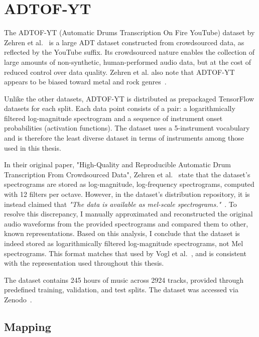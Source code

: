 \section{ADTOF-YT}

The ADTOF-YT (Automatic Drums Transcription On Fire YouTube) dataset by Zehren et al.~\cite{signals4040042} is a large \gls{ADT} dataset constructed from crowdsourced data, as reflected by the YouTube suffix. Its crowdsourced nature enables the collection of large amounts of non-synthetic, human-performed audio data, but at the cost of reduced control over data quality. Zehren et al. also note that ADTOF-YT appears to be biased toward metal and rock genres~\cite{signals4040042}.

Unlike the other datasets, ADTOF-YT is distributed as prepackaged TensorFlow datasets for each split. Each data point consists of a pair: a logarithmically filtered log-magnitude spectrogram and a sequence of instrument onset probabilities (activation functions). The dataset uses a 5-instrument vocabulary and is therefore the least diverse dataset in terms of instruments among those used in this thesis.

In their original paper, "High-Quality and Reproducible Automatic Drum Transcription From Crowdsourced Data", Zehren et al.~\cite{signals4040042} state that the dataset's spectrograms are stored as log-magnitude, log-frequency spectrograms, computed with 12 filters per octave. However, in the dataset's distribution repository, it is instead claimed that \textit{"The data is available as mel-scale spectrograms."}~\cite{zehren_2023_10084511}. To resolve this discrepancy, I manually approximated and reconstructed the original audio waveforms from the provided spectrograms and compared them to other, known representations. Based on this analysis, I conclude that the dataset is indeed stored as logarithmically filtered log-magnitude spectrograms, not Mel spectrograms. This format matches that used by Vogl et al.~\cite{Vogl2017DrumTV}, and is consistent with the representation used throughout this thesis.

The dataset contains 245 hours of music across 2924 tracks, provided through predefined training, validation, and test splits. The dataset was accessed via Zenodo~\cite{zehren_2023_10084511, signals4040042}.

\subsection{Mapping}

